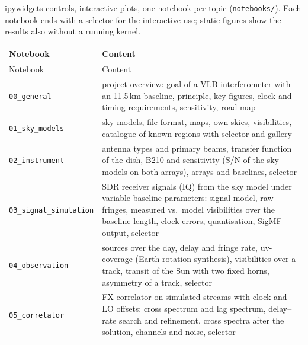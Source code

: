 
ipywidgets controls, interactive plots, one notebook per topic
(\texttt{notebooks/}). Each notebook ends with a selector for the
interactive use; static figures show the results also without a running
kernel.

\begin{longtable}{@{}l>{\raggedright\arraybackslash}p{9.6cm}@{}}
\toprule
Notebook & Content \\
\midrule
\endfirsthead
\toprule
Notebook & Content \\
\midrule
\endhead
\bottomrule
\endlastfoot
\texttt{00\_general} & project overview: goal of a VLB interferometer
  with an 11.5\,km baseline, principle, key figures, clock and timing
  requirements, sensitivity, road map \\
\texttt{01\_sky\_models} & sky models, file format, maps, own skies,
  visibilities, catalogue of known regions with selector and gallery \\
\texttt{02\_instrument} & antenna types and primary beams, transfer
  function of the dish, B210 and sensitivity (S/N of the sky models on
  both arrays), arrays and baselines, selector \\
\texttt{03\_signal\_simulation} & SDR receiver signals (IQ) from the sky
  model under variable baseline parameters: signal model, raw fringes,
  measured vs.\ model visibilities over the baseline length, clock errors,
  quantisation, SigMF output, selector \\
\texttt{04\_observation} & sources over the day, delay and fringe rate,
  uv-coverage (Earth rotation synthesis), visibilities over a track,
  transit of the Sun with two fixed horns, asymmetry of a track, selector \\
\texttt{05\_correlator} & FX correlator on simulated streams with clock
  and LO offsets: cross spectrum and lag spectrum, delay--rate search and
  refinement, cross spectra after the solution, channels and noise,
  selector \\

\end{longtable}
